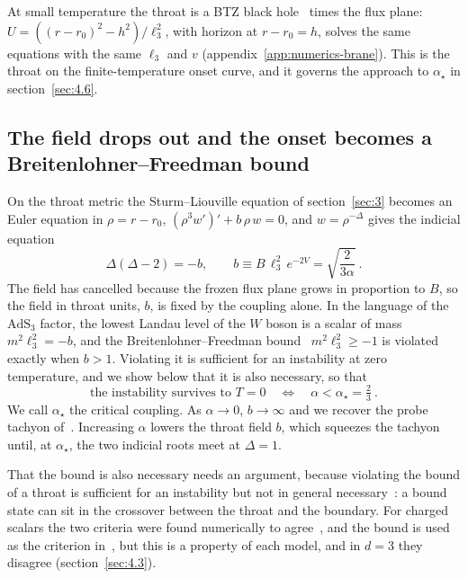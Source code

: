 At small temperature the throat is a BTZ black hole~\cite{Banados:1992wn}
times the flux plane:
$U = ((r-r_0)^2 - h^2)/\ell_3^2$, with horizon at $r - r_0 = h$, solves the
same equations with the same $\ell_3$ and $v$
(appendix~\ref{app:numerics-brane}). This is the throat on the
finite-temperature onset curve, and it governs the approach to
$\alpha_\star$ in section~\ref{sec:4.6}.

\subsection{The field drops out and the onset becomes a Breitenlohner--Freedman bound}
\label{sec:4.2}

On the throat metric the Sturm--Liouville equation of section~\ref{sec:3}
becomes an Euler equation in $\rho = r - r_0$, $(\rho^3 w')' + b\,\rho\,w = 0$, and $w = \rho^{-\Delta}$
gives the indicial equation
\begin{equation}
\Delta(\Delta - 2) = -b, \qquad b \equiv B\,\ell_3^2\,e^{-2V} = \sqrt{\frac{2}{3\alpha}}~.
\end{equation}
The field has cancelled because the frozen flux plane grows in
proportion to $B$, so the field in throat units, $b$, is fixed by the
coupling alone. In the language of the $\mathrm{AdS}_3$ factor, the lowest
Landau level of the $W$ boson is a scalar of mass $m^2\ell_3^2 = -b$, and
the Breitenlohner--Freedman
bound~\cite{Breitenlohner:1982bm,Breitenlohner:1982jf}
$m^2\ell_3^2 \ge -1$ is violated exactly
when $b > 1$. Violating it is sufficient for an instability at zero
temperature, and we show below that it is also necessary, so that
\begin{equation}
\text{the instability survives to } T = 0 \quad\Longleftrightarrow\quad \alpha < \alpha_\star = \tfrac23~.
\end{equation}
We call $\alpha_\star$ the critical coupling. As $\alpha \to 0$, $b \to \infty$
and we recover the probe tachyon of~\cite{Ammon:2011je}. Increasing
$\alpha$ lowers the throat field $b$, which squeezes the tachyon until, at
$\alpha_\star$, the two indicial roots meet at $\Delta = 1$.

That the bound is also necessary needs an argument, because
violating the bound of a throat is sufficient for an instability but not in
general necessary~\cite{Faulkner:2010gj,Horowitz:2010gk}: a bound state can
sit in the crossover between the throat and the boundary. For charged
scalars the two criteria were found numerically to
agree~\cite{Denef:2009tp}, and the bound is used as the criterion
in~\cite{Gubser:2009cg,Horowitz:2009ij}, but this is a
property of each model, and in $d = 3$ they disagree
(section~\ref{sec:4.3}).

